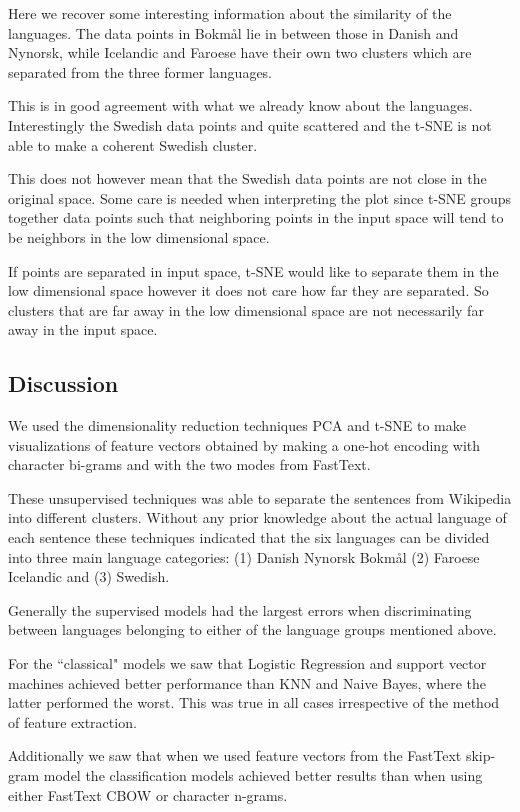 \documentclass[11pt,a4paper]{article}
\begin{document}
Here we recover some interesting information about the similarity of the languages. The data points in Bokmål lie in between those in Danish and Nynorsk, while Icelandic and Faroese have their own two clusters which are separated from the three former languages. 

This is in good agreement with what we already know about the languages. Interestingly the Swedish data points and quite scattered and the t-SNE is not able to make a coherent Swedish cluster.

This does not however mean that the Swedish data points are not close in the original space. Some care is needed when interpreting the plot since t-SNE groups together data points such that neighboring points in the input space will tend to be neighbors in the low dimensional space.

If points are separated in input space, t-SNE would like to separate them in the low dimensional space however it does not care how far they are separated. So clusters that are far away in the low dimensional space are not necessarily far away in the input space.

\subsection{Discussion}
We used the dimensionality reduction techniques PCA and t-SNE to make visualizations of feature vectors obtained by making a one-hot encoding with character bi-grams and with the two modes from FastText.

These unsupervised techniques was able to separate the sentences from Wikipedia into different clusters.
Without any prior knowledge about the actual language of each sentence these techniques indicated that the six languages can be divided into three main language categories: (1) Danish Nynorsk Bokmål (2) Faroese Icelandic and (3) Swedish.


Generally the supervised models had the largest errors when discriminating between languages belonging to either of the language groups mentioned above.

For the ``classical" models we saw that Logistic Regression and support vector machines achieved better performance than KNN and Naive Bayes, where the latter performed the worst. This was true in all cases irrespective of the method of feature extraction.

Additionally we saw that when we used feature vectors from the FastText skip-gram model the classification models achieved better results than when using either FastText CBOW or character n-grams.
\end{document}

